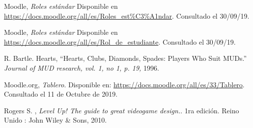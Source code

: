 \begin{thebibliography}{9}
        Moodle, {\it Roles estándar}
        Disponible en \url{https://docs.moodle.org/all/es/Roles_est\%C3\%A1ndar}.
        Consultado el 30/09/19.

        Moodle, {\it Roles estándar}
        Disponible en \url{https://docs.moodle.org/all/es/Rol_de_estudiante}.
        Consultado el 30/09/19.

        R. Bartle. Hearts, 
        ``Hearts, Clubs, Diamonds, Spades: Players Who Suit MUDs.''
        \textit{Journal of MUD research, vol. 1, no 1, p. 19,} 1996.



        Moodle.org, {\it Tablero}.
        Disponible en: \url{https://docs.moodle.org/all/es/33/Tablero}.
        Consultado el 11 de Octubre de 2019.











    
        Rogers S. , \textit{Level Up! The guide to great videogame design.}. 1ra edición. Reino Unido : John Wiley \& Sons, 2010. 
        

\end{thebibliography}
